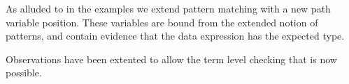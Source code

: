 As alluded to in the examples we extend pattern matching with a new path variable position.
These variables are bound from the extended notion of patterns, and contain evidence that the data expression has the expected type.

Observations have been extented to allow the term level checking that is now possible.


